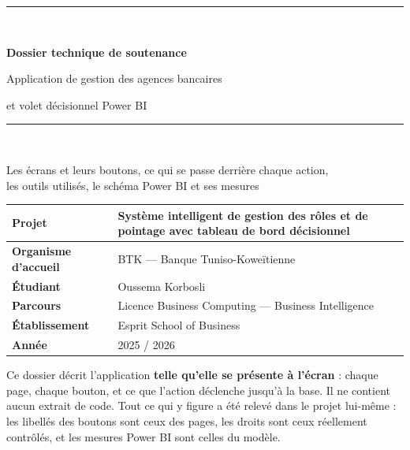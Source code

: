 \documentclass[a4paper,11pt]{article}
\begin{document}
\begin{titlepage}
\centering
\vspace*{1.4cm}
{\color{btkblue}\rule{\textwidth}{2.5pt}}\\[0.4cm]
{\Huge\bfseries\color{btkblue} Dossier technique de soutenance\par}
\vspace{0.5cm}
{\LARGE Application de gestion des agences bancaires\par}
\vspace{0.25cm}
{\Large\color{btklight} et volet décisionnel Power BI\par}
\vspace{0.35cm}
{\color{btkblue}\rule{\textwidth}{2.5pt}}\\[1.5cm]

{\large Les écrans et leurs boutons, ce qui se passe derrière chaque action,\\
les outils utilisés, le schéma Power BI et ses mesures\par}
\vspace{2cm}

\begin{tabularx}{0.86\textwidth}{|>{\bfseries}L{4.4cm}|X|}
\hline
Projet & Système intelligent de gestion des rôles et de pointage avec tableau de bord décisionnel\\
\hline
Organisme d'accueil & BTK --- Banque Tuniso-Koweïtienne\\
\hline
Étudiant & Oussema Korbosli\\
\hline
Parcours & Licence Business Computing --- Business Intelligence\\
\hline
Établissement & Esprit School of Business\\
\hline
Année & 2025 / 2026\\
\hline
\end{tabularx}

\vfill
\begin{retenir}
\small Ce dossier décrit l'application \textbf{telle qu'elle se présente à
l'écran} : chaque page, chaque bouton, et ce que l'action déclenche
jusqu'à la base. Il ne contient aucun extrait de code. Tout ce qui y figure a
été relevé dans le projet lui-même : les libellés des boutons sont ceux des
pages, les droits sont ceux réellement contrôlés, et les mesures Power BI sont
celles du modèle.
\end{retenir}
\vspace{0.6cm}
\end{titlepage}
\end{document}
